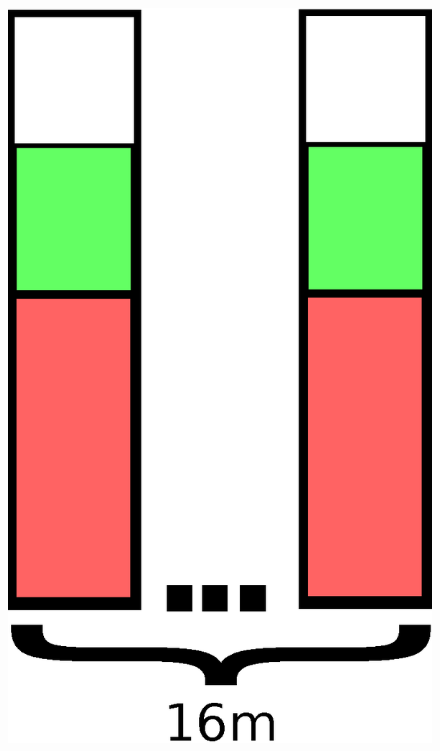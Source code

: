 \documentclass{article}
\begin{document}
\begin{multicols}{2}
\begin{figure}[H]
\begin{center}
	\includegraphics[scale=.3]{second}
\end{center}
\end{figure}
\end{multicols}
\end{document}
